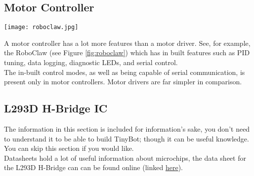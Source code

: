 \documentclass[../TinyBot.tex]{subfiles}
\begin{document}
\subsection{Motor Controller}

\begin{minipage}{0.3\textwidth}\vspace{0pt}
    \texttt{[image: roboclaw.jpg]}
    \label{fig:roboclaw}
\end{minipage}
\begin{minipage}{0.7\textwidth}\vspace{0pt}
    A motor controller has a lot more features than a motor driver. See, for example, the RoboClaw  (see Figure \ref{fig:roboclaw}) which has in built features such as PID tuning, data logging, diagnostic LEDs, and serial control. \\
    
    
    The in-built control modes, as well as being capable of serial communication, is present only in motor controllers. Motor drivers are far simpler in comparison. \\

\end{minipage}

\pagebreak
\subsection{L293D H-Bridge IC}

The information in this section is included for information's sake, you don't need to understand it to be able to build TinyBot; though it can be useful knowledge. You can skip this section if you would like. \\



Datasheets hold a lot of useful information about microchips, the data sheet for the L293D H-Bridge can can be found online (linked \href{https://www.altronics.com.au/p/z2900-l293d-motor-drive-ic/}{here}).\\




        
\end{document}
